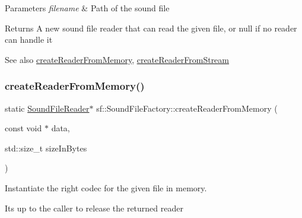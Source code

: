 \begin{DoxyParams}{Parameters}
{\em filename} & Path of the sound file\\
\hline
\end{DoxyParams}
\begin{DoxyReturn}{Returns}
A new sound file reader that can read the given file, or null if no reader can handle it
\end{DoxyReturn}
\begin{DoxySeeAlso}{See also}
\mbox{\hyperlink{classsf_1_1_sound_file_factory_aee7a0ff1eace98d5325eaadc7d26d50c}{create\+Reader\+From\+Memory}}, \mbox{\hyperlink{classsf_1_1_sound_file_factory_a8d4b1f225b72a128ddba3be22f7ba5a2}{create\+Reader\+From\+Stream}} \begin{DoxyVerb}\end{DoxyVerb}
 
\end{DoxySeeAlso}
\mbox{\label{classsf_1_1_sound_file_factory_aee7a0ff1eace98d5325eaadc7d26d50c}} 
\subsubsection{\texorpdfstring{createReaderFromMemory()}{createReaderFromMemory()}}
{\footnotesize\ttfamily static \mbox{\hyperlink{classsf_1_1_sound_file_reader}{Sound\+File\+Reader}}$\ast$ sf\+::\+Sound\+File\+Factory\+::create\+Reader\+From\+Memory (\begin{DoxyParamCaption}\item[{const void $\ast$}]{data,  }\item[{std\+::size\+\_\+t}]{size\+In\+Bytes }\end{DoxyParamCaption})\hspace{0.3cm}{\ttfamily [static]}}



Instantiate the right codec for the given file in memory. 

It\textquotesingle{}s up to the caller to release the returned reader


